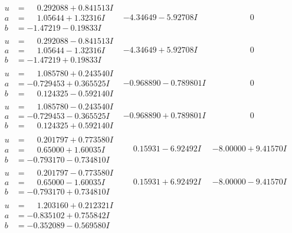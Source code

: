 \documentclass[1p]{elsarticle_modified}
\theoremstyle{definition}
\begin{document}
$$\begin{array}{c|c|c}
\begin{aligned}
u &= \phantom{-}0.292088 + 0.841513 I \\
a &= \phantom{-}1.05644 + 1.32316 I \\
b &= -1.47219 - 0.19833 I\end{aligned}
 & -4.34649 - 5.92708 I & \phantom{-0.000000 } 0 \\ \hline\begin{aligned}
u &= \phantom{-}0.292088 - 0.841513 I \\
a &= \phantom{-}1.05644 - 1.32316 I \\
b &= -1.47219 + 0.19833 I\end{aligned}
 & -4.34649 + 5.92708 I & \phantom{-0.000000 } 0 \\ \hline\begin{aligned}
u &= \phantom{-}1.085780 + 0.243540 I \\
a &= -0.729453 + 0.365525 I \\
b &= \phantom{-}0.124325 - 0.592140 I\end{aligned}
 & -0.968890 - 0.789801 I & \phantom{-0.000000 } 0 \\ \hline\begin{aligned}
u &= \phantom{-}1.085780 - 0.243540 I \\
a &= -0.729453 - 0.365525 I \\
b &= \phantom{-}0.124325 + 0.592140 I\end{aligned}
 & -0.968890 + 0.789801 I & \phantom{-0.000000 } 0 \\ \hline\begin{aligned}
u &= \phantom{-}0.201797 + 0.773580 I \\
a &= \phantom{-}0.65000 + 1.60035 I \\
b &= -0.793170 - 0.734810 I\end{aligned}
 & \phantom{-}0.15931 - 6.92492 I & -8.00000 + 9.41570 I \\ \hline\begin{aligned}
u &= \phantom{-}0.201797 - 0.773580 I \\
a &= \phantom{-}0.65000 - 1.60035 I \\
b &= -0.793170 + 0.734810 I\end{aligned}
 & \phantom{-}0.15931 + 6.92492 I & -8.00000 - 9.41570 I \\ \hline\begin{aligned}
u &= \phantom{-}1.203160 + 0.212321 I \\
a &= -0.835102 + 0.755842 I \\
b &= -0.352089 - 0.569580 I\end{aligned}

\end{array}$$
\end{document}
